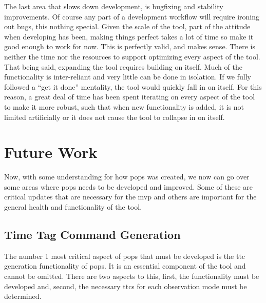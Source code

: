 The last area that slows down development, is bugfixing and stability
improvements. Of course any part of a development workflow will require ironing
out bugs, this nothing special. Given the scale of the tool, part of the
attitude when developing has been, making things perfect takes a lot of time so
make it good enough to work for now. This is perfectly valid, and makes sense.
There is neither the time nor the resources to support optimizing every aspect
of the tool. That being said, expanding the tool requires building on itself.
Much of the functionality is inter-reliant and very little can be done in
isolation. If we fully followed a ``get it done'' mentality, the tool would
quickly fall in on itself. For this reason, a great deal of time has been spent
iterating on every aspect of the tool to make it more robust, such that when
new functionality is added, it is not limited artificially or it does not cause
the tool to collapse in on itself.



\section{Future Work}

Now, with some understanding for how \gls{pops} was created, we now can go over
some areas where \gls{pops} needs to be developed and improved. Some of these
are critical updates that are necessary for the \gls{mvp} and others are
important for the general health and functionality of the tool.

\subsection{Time Tag Command Generation}

The number 1 most critical aspect of \gls{pops} that must be developed is the
\gls{ttc} generation functionality of \gls{pops}. It is an essential component
of the tool and cannot be omitted. There are two aspects to this, first, the
functionality must be developed and, second, the necessary \glspl{ttc} for each
observation mode must be determined.


